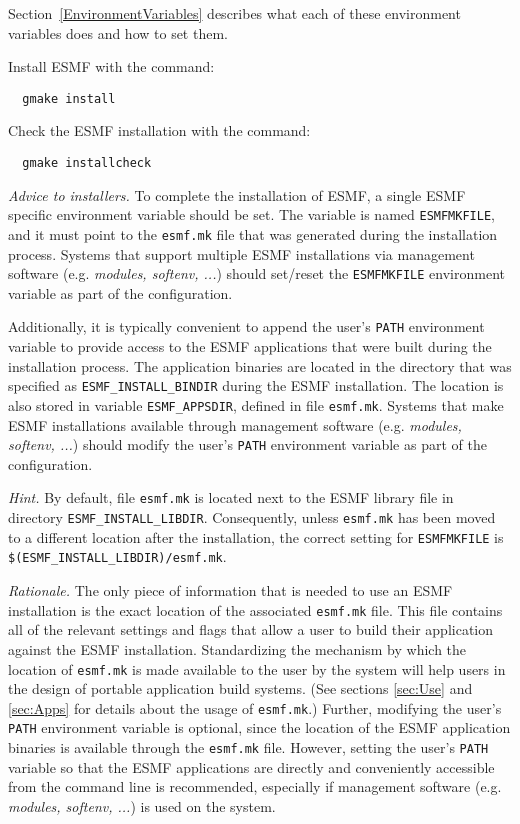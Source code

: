 Section~\ref{EnvironmentVariables} describes what each of these 
environment variables does and how to set them.

Install ESMF with the command:
\begin{verbatim}
  gmake install
\end{verbatim}

Check the ESMF installation with the command:
\begin{verbatim}
  gmake installcheck
\end{verbatim}

{\em Advice to installers.} To complete the installation of ESMF, a single ESMF specific environment variable should be set. The variable is named {\tt ESMFMKFILE}, and it must point to the {\tt esmf.mk} file that was generated during the installation process. Systems that support multiple ESMF installations via management software (e.g. {\em modules, softenv, ...}) should set/reset the {\tt ESMFMKFILE} environment variable as part of the configuration.

Additionally, it is typically convenient to append the user's {\tt PATH} environment variable to provide access to the ESMF applications that were built during the installation process. The application binaries are located in the directory that was specified as {\tt ESMF\_INSTALL\_BINDIR} during the ESMF installation. The location is also stored in variable {\tt ESMF\_APPSDIR}, defined in file {\tt esmf.mk}. Systems that make ESMF installations available through management software (e.g. {\em modules, softenv, ...}) should modify the user's {\tt PATH} environment variable as part of the configuration.

{\em Hint.} By default, file {\tt esmf.mk} is located next to the ESMF library file in  directory {\tt ESMF\_INSTALL\_LIBDIR}. Consequently, unless {\tt esmf.mk} has been moved to a different location after the installation, the correct setting for {\tt ESMFMKFILE} is {\tt \$(ESMF\_INSTALL\_LIBDIR)/esmf.mk}.

{\em Rationale.} The only piece of information that is needed to use an ESMF installation is the exact location of the associated {\tt esmf.mk} file. This file contains all of the relevant settings and flags that allow a user to build their application against the ESMF installation. Standardizing the mechanism by which the location of {\tt esmf.mk} is made available to the user by the system will help users in the design of portable application build systems. (See sections \ref{sec:Use} and \ref{sec:Apps} for details about the usage of {\tt esmf.mk}.) Further, modifying the user's {\tt PATH} environment variable is optional, since the location of the ESMF application binaries is available through the {\tt esmf.mk} file. However, setting the user's {\tt PATH} variable so that the ESMF applications are directly and conveniently accessible from the command line is recommended, especially if management software (e.g. {\em modules, softenv, ...}) is used on the system.
